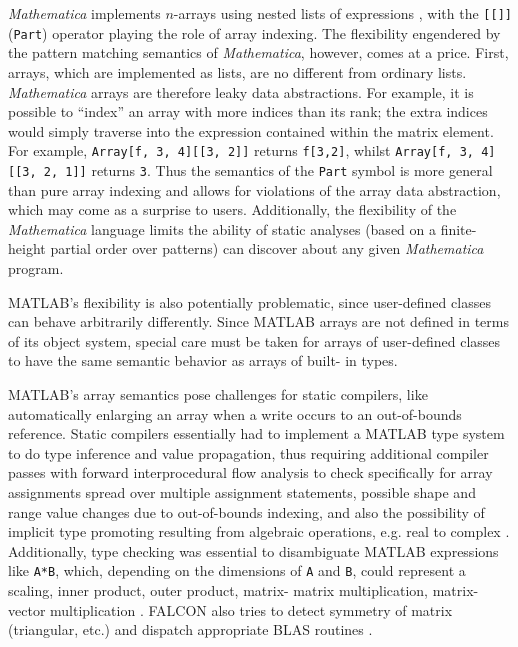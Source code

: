 \documentclass[preprint]{sigplanconf}
\newcommand{\MATLAB}{\textsc{MATLAB}}
\newcommand{\Mathematica}{\textit{Mathematica}}
\newcommand{\code}[1]{\texttt{#1}}
\begin{document}
\begin{enumerate}
\Mathematica{} implements $n$-arrays using nested lists of expressions
\cite{mathematica:nl, mathematica:int}, with the \code{[[]]} (\code{Part})
operator playing the role of array indexing. The flexibility engendered by the
pattern matching semantics of \Mathematica, however, comes at a price. First,
arrays, which are implemented as lists, are no different from ordinary lists.
\Mathematica{} arrays are therefore leaky data abstractions. For example, it
is possible to ``index'' an array with more indices than its rank; the extra
indices would simply traverse into the expression contained within the matrix
element. For example, \code{Array[f, {3, 4}][[3, 2]]} returns \code{f[3,2]},
whilst \code{Array[f, {3, 4}][[3, 2, 1]]} returns \code{3}. Thus the semantics
of the \code{Part} symbol is more general than pure array indexing and allows
for violations of the array data abstraction, which may come as a surprise to
users. Additionally, the flexibility of the \Mathematica{} language limits the
ability of static analyses (based on a finite-height partial order over
patterns) can discover about any given \Mathematica{} program.

\MATLAB's flexibility is also potentially problematic, since user-defined
classes can behave arbitrarily differently. Since \MATLAB{} arrays are not
defined in terms of its object system, special care must be taken for arrays
of user-defined classes to have the same semantic behavior as arrays of built-
in types.


\MATLAB's array semantics pose challenges for static compilers, like
automatically enlarging an array when a write occurs to an out-of-bounds
reference. Static compilers essentially had to implement a \MATLAB{} type
system to do type inference and value propagation, thus requiring additional
compiler passes with forward interprocedural ﬂow analysis to check
specifically for array assignments spread over multiple assignment
statements, possible shape and range value changes due to out-of-bounds
indexing, and also the possibility of implicit type promoting resulting from
algebraic operations, e.g. real to complex \cite{Rose:1999tt, Li:2013mf}.
Additionally, type checking was essential to disambiguate \MATLAB{}
expressions like \code{A*B}, which, depending on the dimensions of \code{A} and
\code{B}, could represent a scaling, inner product, outer product, matrix-
matrix multiplication, matrix-vector multiplication \cite{Rose:1999tt}. FALCON
also tries to detect symmetry of matrix (triangular, etc.) and dispatch
appropriate BLAS routines \cite{Rose:1999tt}.


\end{enumerate}
\end{document}
